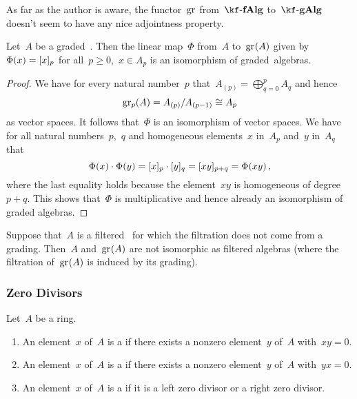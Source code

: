 \begin{remark}
	As far as the author is aware, the functor~$\gr$ from~$\cfAlg{\kf}$ to~$\cgAlg{\kf}$ doesn’t seem to have any nice adjointness property.
\end{remark}


\begin{proposition}
	Let~$A$ be a graded~{\algebra{$\kf$}}.
	Then the linear map~$\Phi$ from~$A$ to~$\gr(A)$ given by~$\Phi(x) = \lbrack x\rbrack_p$ for all~$p \geq 0$,~$x \in A_p$ is an isomorphism of graded~algebras.
\end{proposition}


\begin{proof}
	We have for every natural number~$p$ that~$A_{(p)} = \bigoplus_{q=0}^p A_q$ and hence
	\[
		\gr[p](A)
		=
		A_{(p)} / A_{(p-1)}
		\cong
		A_p
	\]
	as vector spaces.
	It follows that~$\Phi$ is an isomorphism of vector spaces.
	We have for all natural numbers~$p$,~$q$ and homogeneous elements~$x$ in~$A_p$ and~$y$ in~$A_q$ that
	\[
		\Phi(x) \cdot \Phi(y)
		=
		\lbrack x\rbrack_p \cdot \lbrack y\rbrack_q
		=
		\lbrack xy\rbrack_{p+q}
		=
		\Phi(xy) \,,
	\]
	where the last equality holds because the element~$xy$ is homogeneous of degree~$p + q$.
	This shows that~$\Phi$ is multiplicative and hence already an isomorphism of graded algebras.
\end{proof}


\begin{warning}
	Suppose that~$A$ is a filtered~\algebra{$\kf$} for which the filtration does not come from a grading.
	Then~$A$ and~$\gr(A)$ are not isomorphic as filtered algebras (where the filtration of~$\gr(A)$ is induced by its grading).
\end{warning}

\subsubsection{Zero Divisors}

\begin{definition}
	Let~$A$ be a ring.
	\begin{enumerate}
		\item
			An element~$x$ of~$A$ is a  if there exists a nonzero element~$y$ of~$A$ with~$xy = 0$.
		\item
			An element~$x$ of~$A$ is a  if there exists a nonzero element~$y$ of~$A$ with~$yx = 0$.
		\item
			An element~$x$ of~$A$ is a  if it is a left zero divisor or a right zero divisor.
	\end{enumerate}
\end{definition}


